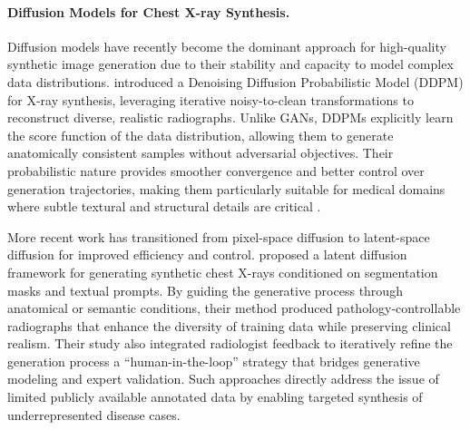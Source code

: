 \paragraph{Diffusion Models for Chest X-ray Synthesis.}
Diffusion models have recently become the dominant approach for high-quality synthetic image generation due to their stability and capacity to model complex data distributions. 
\citet{mahaulpatha2024ddpm} introduced a Denoising Diffusion Probabilistic Model (DDPM) for X-ray synthesis, leveraging iterative noisy-to-clean transformations to reconstruct diverse, realistic radiographs. 
Unlike GANs, DDPMs explicitly learn the score function of the data distribution, allowing them to generate anatomically consistent samples without adversarial objectives. 
Their probabilistic nature provides smoother convergence and better control over generation trajectories, making them particularly suitable for medical domains where subtle textural and structural details are critical \citep{novel_unified_conditional_score_based_generative_framework_2022}.

More recent work has transitioned from pixel-space diffusion to latent-space diffusion for improved efficiency and control. 
\citet{prakash2025evaluating} proposed a latent diffusion framework for generating synthetic chest X-rays conditioned on segmentation masks and textual prompts. 
By guiding the generative process through anatomical or semantic conditions, their method produced pathology-controllable radiographs that enhance the diversity of training data while preserving clinical realism. 
Their study also integrated radiologist feedback to iteratively refine the generation process a ``human-in-the-loop'' strategy that bridges generative modeling and expert validation. 
Such approaches directly address the issue of limited publicly available annotated data by enabling targeted synthesis of underrepresented disease cases. 


